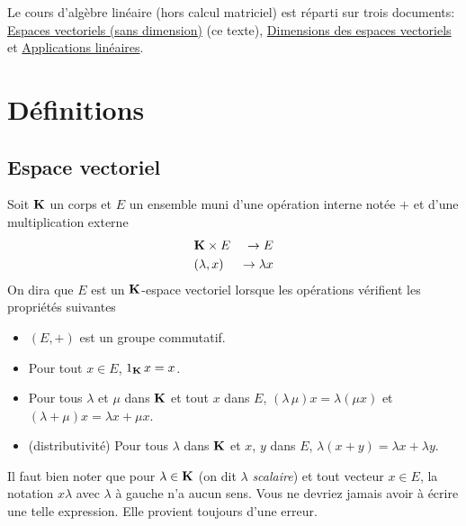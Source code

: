 
Le cours d'algèbre linéaire (hors calcul matriciel) est réparti sur trois documents:  \href{\baseurl C2076.pdf}{Espaces vectoriels (sans dimension)} (ce texte),  \href{\baseurl C2112.pdf}{Dimensions des espaces vectoriels} et \href{\baseurl C9587.pdf}{Applications linéaires}.
\section{Définitions}
\subsection{Espace vectoriel}
\begin{defi}
 Soit $\mathbf{K}$ un corps et $E$ un ensemble muni d'une opération interne notée $+$ et d'une multiplication externe
\begin{displaymath}
 \begin{aligned}
  &\mathbf{K}\times E &\rightarrow E\\
 &(\lambda,x) &\rightarrow \lambda x
 \end{aligned}
\end{displaymath}
  On dira que $E$ est un $\mathbf{K}$-espace vectoriel lorsque les opérations vérifient les propriétés suivantes
\begin{itemize}
 \item $(E,+)$ est un groupe commutatif.
 \item Pour tout $x\in E$, $1_{\mathbf{K}}\,x = x$.
 \item Pour tous $\lambda$ et $\mu$ dans $\mathbf{K}$ et tout $x$ dans $E$, $(\lambda\,\mu)x = \lambda (\mu x)$ et $(\lambda + \mu)x = \lambda x + \mu x$.
 \item (distributivité) Pour tous $\lambda$ dans $\mathbf{K}$ et $x$, $y$ dans $E$, $\lambda(x+y)=\lambda x + \lambda y$.
\end{itemize}
\end{defi}
\begin{rem} Il faut bien noter que pour $\lambda \in \mathbf{K}$ (on dit $\lambda$ \emph{scalaire}) et tout vecteur $x\in E$, la notation $x\lambda$ avec $\lambda$ à gauche n'a aucun sens. Vous ne devriez jamais avoir à écrire une telle expression. Elle provient toujours d'une erreur. 
\end{rem}

